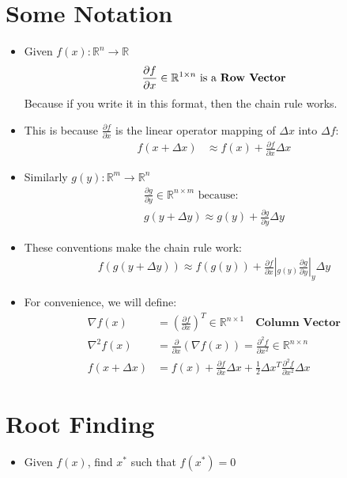 \documentclass[11pt]{article}
\begin{document}
\section{Some Notation}
\begin{itemize}
    \item Given $f(x): \mathbb{R}^n\rightarrow\mathbb{R}$
    \begin{align*}
        \frac{\partial f}{\partial x}\in \mathbb{R}^{1\times n} \text{ is a \textbf{Row Vector}}
    \end{align*}
    Because if you write it in this format, then the chain rule works.
    \item This is because $\frac{\partial f}{\partial x}$ is the linear operator mapping of $\Delta x$ into $\Delta f$:
    \begin{align*}
        f(x+\Delta x) &\approx f(x) + \frac{\partial f}{\partial x}\Delta x
    \end{align*}
    \item Similarly $g(y): \mathbb{R}^m\rightarrow \mathbb{R}^n$
    \begin{align*}
        \frac{\partial g}{\partial y} \in \mathbb{R}^{n\times m} \text{ because:}
        \\
        g(y + \Delta y) \approx g(y) + \frac{\partial g}{\partial y}\Delta y
    \end{align*}
    \item These conventions make the chain rule work:
    \begin{align*}
        f(g(y+\Delta y)) \approx f(g(y)) + \frac{\partial f}{\partial x}|_{g(y)}\frac{\partial g}{\partial y}|_y\Delta y
    \end{align*}
    \item For convenience, we will define:
    \begin{align*}
        \nabla f(x) &= \left(\frac{\partial f}{\partial x}\right)^T \in \mathbb{R}^{n\times 1} \quad\textbf{Column Vector}
        \\
        \nabla^2 f(x) &= \frac{\partial}{\partial x}(\nabla f(x)) = \frac{\partial^2 f}{\partial x^2} \in \mathbb{R}^{n\times n}
        \\
        f(x+\Delta x) &= f(x) + \frac{\partial f}{\partial x}\Delta x + \frac{1}{2}\Delta x^T \frac{\partial^2 f}{\partial x^2}\Delta x
    \end{align*}
\end{itemize}


\section{Root Finding}
\begin{itemize}
    \item Given $f(x)$, find $x^*$ such that $f(x^*) = 0$
\end{itemize}
\end{document}
